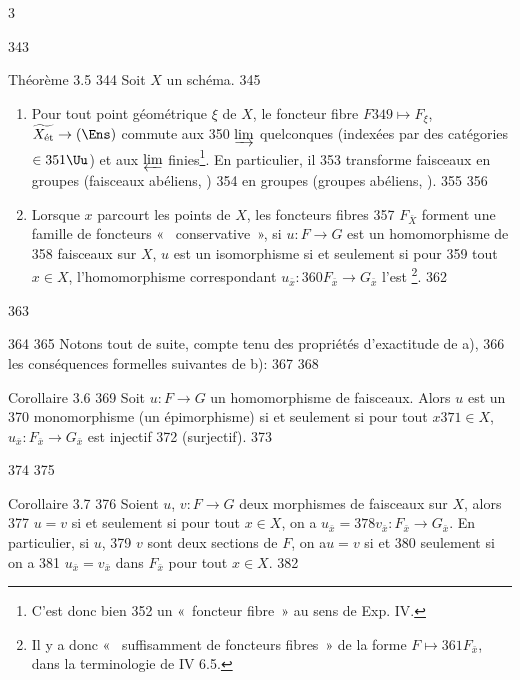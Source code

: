 3	\documentclass[10pt]{../fichiers-configuration-latex/smfart}
\begin{document}
   343	\begin{enonce*}{Théorème 3.5}
   344	Soit $X$ un schéma.
   345	\begin{enumerate}
   346	\renewcommand{\theenumi}{\alph{enumi}}
   347	\renewcommand{\labelenumi}{\theenumi)}
   348	\item Pour tout point géométrique $\xi$ de $X$, le foncteur fibre $F
   349	  \mapsto F_{\xi}$, $\widetilde{X_{\text{\rm ét}}} \to (\Ens)$ commute aux
   350	  $\varinjlim$ quelconques (indexées par des catégories $\in
   351	  \Uu$) et aux $\varprojlim$ finies\footnote{C'est donc bien
   352	  un « foncteur fibre » au sens de Exp. IV.}. En particulier, il
   353	  transforme faisceaux en groupes (\resp faisceaux abéliens, \etc)
   354	  en groupes (\resp groupes abéliens, \etc).
   355	
   356	\item Lorsque $x$ parcourt les points de $X$, les foncteurs fibres
   357	  $F_{\bar{X}}$ forment une famille de foncteurs «   conservative », \ie si $u : F \to G$ est un homomorphisme de
   358	  faisceaux sur $X$, $u$ est un isomorphisme si et seulement si pour
   359	  tout $x \in X$, l'homomorphisme correspondant $u_{\bar{x}} :
   360	  F_{\bar{x}} \to G_{\bar{x}}$ l'est \footnote{Il y a donc «   suffisamment de foncteurs fibres » de la forme $F \mapsto
   361	  F_{\bar{x}}$, dans la terminologie de IV 6.5.}.
   362	\end{enumerate}
   363	\end{enonce*}
   364	
   365	Notons tout de suite, compte tenu des propriétés d'exactitude de a),
   366	les conséquences formelles suivantes de b):
   367	
   368	\begin{enonce*}{Corollaire 3.6}
   369	Soit $u : F \to G$ un homomorphisme de faisceaux. Alors $u$ est un
   370	monomorphisme (\resp un épimorphisme) si et seulement si pour tout $x
   371	\in X$, $u_{\bar{x}}:F_{\bar{x}}\to G_{\bar{x}}$ est injectif
   372	(\resp surjectif).
   373	\end{enonce*}
   374	
   375	\begin{enonce*}{Corollaire 3.7}
   376	Soient $u$, $v : F \to G$ deux morphismes de faisceaux sur $X$, alors
   377	$u = v$ si et seulement si pour tout $x \in X$, on a $u_{\bar{x}} =
   378	v_{\bar{x}} : F_{\bar{x}} \to G_{\bar{x}}$. En particulier, si $u$,
   379	$v$ sont deux sections de $F$, on a\pageoriginale  $u = v$ si et
   380	seulement si on a
   381	$u_{\bar{x}} = v_{\bar{x}}$ dans $F_{\bar{x}}$ pour tout $x \in X$.
   382	\end{enonce*}
\end{document}

